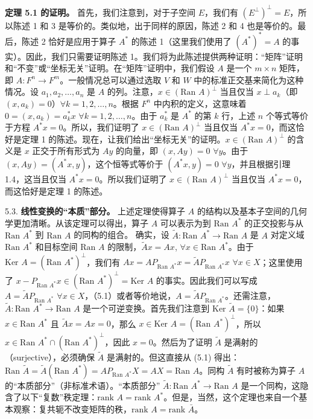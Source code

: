 \textbf{定理 5.1 的证明。} 首先，我们注意到，对于子空间 $E$，我们有 $(E^\perp)^\perp = E$，所以陈述 1 和 3 是等价的。类似地，出于同样的原因，陈述 2 和 4 也是等价的。最后，陈述 2 恰好是应用于算子 $A^*$ 的陈述 1（这里我们使用了 $(A^*)^* = A$ 的事实）。因此，我们只需要证明陈述 1。我们将为此陈述提供两种证明：“矩阵”证明和“不变”或“坐标无关”证明。在“矩阵”证明中，我们假设 $A$ 是一个 $m \times n$ 矩阵，即 $A: F^n \to F^m$。一般情况总可以通过选取 $V$ 和 $W$ 中的标准正交基来简化为这种情况。设 $a_1, a_2, \dots, a_n$ 是 $A$ 的列。注意，$x \in (\text{Ran } A)^\perp$ 当且仅当 $x \perp a_k$（即 $(x, a_k) = 0$）$\forall k = 1, 2, \dots, n$。根据 $F^n$ 中内积的定义，这意味着 $0 = (x, a_k) = a_k^* x$ $\forall k = 1, 2, \dots, n$。由于 $a_k^*$ 是 $A^*$ 的第 $k$ 行，上述 $n$ 个等式等价于方程 $A^*x = 0$。所以，我们证明了 $x \in (\text{Ran } A)^\perp$ 当且仅当 $A^*x = 0$，而这恰好是定理 1 的陈述。现在，让我们给出“坐标无关”的证明。$x \in (\text{Ran } A)^\perp$ 的含义是 $x$ 正交于所有形式为 $Ay$ 的向量，即 $(x, Ay) = 0$ $\forall y$。由于 $(x, Ay) = (A^*x, y)$，这个恒等式等价于 $(A^*x, y) = 0$ $\forall y$，并且根据引理 1.4，这当且仅当 $A^*x = 0$。所以我们证明了 $x \in (\text{Ran } A)^\perp$ 当且仅当 $A^*x = 0$，而这恰好是定理 1 的陈述。

5.3. \textbf{线性变换的“本质”部分。} 上述定理使得算子 $A$ 的结构以及基本子空间的几何学更加清晰。从该定理可以得出，算子 $A$ 可以表示为到 $\text{Ran } A^*$ 的正交投影与从 $\text{Ran } A^*$ 到 $\text{Ran } A$ 的同构的组合。
确实，设 $\tilde{A}: \text{Ran } A^* \to \text{Ran } A$ 是 $A$ 对定义域 $\text{Ran } A^*$ 和目标空间 $\text{Ran } A$ 的限制，$\tilde{A}x = Ax$, $\forall x \in \text{Ran } A^*$。由于 $\text{Ker } A = (\text{Ran } A^*)^\perp$，我们有 $Ax = AP_{\text{Ran } A^*}x = \tilde{A}P_{\text{Ran } A^*}x$ $\forall x \in X$；这里使用了 $x - P_{\text{Ran } A^*}x \in (\text{Ran } A^*)^\perp = \text{Ker } A$ 的事实。因此我们可以写成 $A = \tilde{A}P_{\text{Ran } A^*}$ $\forall x \in X$，（5.1）或者等价地说，$A = \tilde{A}P_{\text{Ran } A^*}$。还需注意，$\tilde{A}: \text{Ran } A^* \to \text{Ran } A$ 是一个可逆变换。首先我们注意到 $\text{Ker } \tilde{A} = \{0\}$：如果 $x \in \text{Ran } A^*$ 且 $\tilde{A}x = Ax = 0$，那么 $x \in \text{Ker } A = (\text{Ran } A^*)^\perp$，所以 $x \in \text{Ran } A^* \cap (\text{Ran } A^*)^\perp$，因此 $x = 0$。然后为了证明 $\tilde{A}$ 是满射的（surjective），必须确保 $\tilde{A}$ 是满射的。但这直接从 (5.1) 得出：$\text{Ran } \tilde{A} = \tilde{A}(\text{Ran } A^*) = A P_{\text{Ran } A^*} X = AX = \text{Ran } A$。同构 $\tilde{A}$ 有时被称为算子 $A$ 的“本质部分”（非标准术语）。“本质部分” $\tilde{A}: \text{Ran } A^* \to \text{Ran } A$ 是一个同构，这隐含了以下“复数”秩定理：$\text{rank } A = \text{rank } A^*$。但是，当然，这个定理也来自一个基本观察：复共轭不改变矩阵的秩，$\text{rank } A = \text{rank } \bar{A}$。

